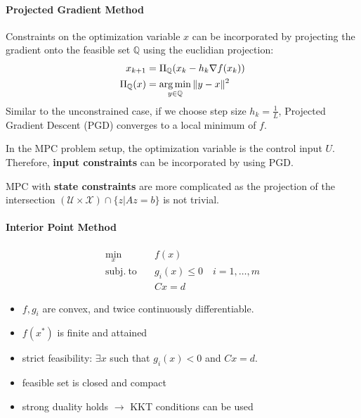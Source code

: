 \paragraph{Projected Gradient Method}
Constraints on the optimization variable $x$ can be incorporated by projecting the gradient onto the feasible set $\mathbb{Q}$ using the euclidian projection:
\begin{align*}
    x_{k+1}             & = \Pi_{\mathbb{Q}}(x_k - h_k \nabla f(x_k)) \\
    \Pi_{\mathbb{Q}}(x) & = \operatorname*{arg\,min}_{y\in\mathbb{Q}} \|y-x\|^2
\end{align*}
Similar to the unconstrained case, if we choose step size $h_k = \frac{1}{L}$, Projected Gradient Descent (PGD) converges to a local minimum of $f$.

\newpar{}

In the MPC problem setup, the optimization variable is the control input $U$. Therefore, \textbf{input constraints} can be incorporated by using PGD.

\newpar{}
MPC with \textbf{state constraints} are more complicated as the projection of the intersection $(\mathcal{U}\times \mathcal{X}) \cap \{ z|Az=b\}$ is not trivial.

\paragraph{Interior Point Method}
\begin{align*}
    \min_x \quad            & f(x)                             \\
    \mathrm{subj.\ to}\quad & g_i(x)\leq 0 \quad i=1,\ldots, m \\
                            & Cx = d
\end{align*}
\begin{itemize}
    \item $f, g_i$ are convex, and twice continuously differentiable.
    \item $f(x^*)$ is finite and attained
    \item strict feasibility: $\exists x$ such that $g_i(x) < 0$ and $Cx = d$.
    \item feasible set is closed and compact
    \item strong duality holds $\to$ KKT conditions can be used
\end{itemize}


